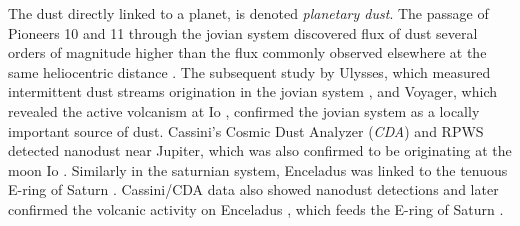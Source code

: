 The dust directly linked to a planet, is denoted \textit{planetary dust}. The passage of Pioneers 10 and 11 through the jovian system discovered flux of dust several orders of magnitude higher than the flux commonly observed elsewhere at the same heliocentric distance \citep{humes1974interplanetary}. The subsequent study by Ulysses, which measured intermittent dust streams origination in the jovian system \citep{grun1993discovery}, and Voyager, which revealed the active volcanism at Io \citep{kruger2004jovian}, confirmed the jovian system as a locally important source of dust. Cassini's Cosmic Dust Analyzer (\textit{CDA}) and RPWS detected nanodust near Jupiter, which was also confirmed to be originating at the moon Io \citep{meyer2009detecting}. Similarly in the saturnian system, Enceladus was linked to the tenuous E-ring of Saturn \citep{baum1981saturn}. Cassini/CDA data also showed nanodust detections \citep{kempf2005high} and later confirmed the volcanic activity on Enceladus \citep{spahn2006cassini}, which feeds the E-ring of Saturn \citep{kempf2010enceladus}. 

